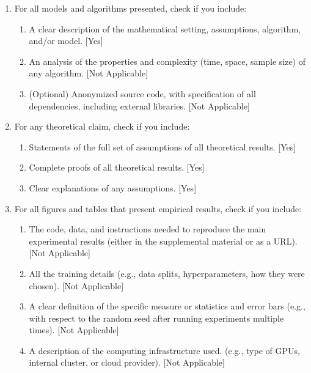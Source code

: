 \documentclass[twoside]{article}
\theoremstyle{definition}
\theoremstyle{remark}
\begin{document}
\begin{enumerate}

  \item For all models and algorithms presented, check if you include:
  \begin{enumerate}
    \item A clear description of the mathematical setting, assumptions, algorithm, and/or model. [Yes]
    \item An analysis of the properties and complexity (time, space, sample size) of any algorithm. [Not Applicable]
    \item (Optional) Anonymized source code, with specification of all dependencies, including external libraries. [Not Applicable]
  \end{enumerate}

  \item For any theoretical claim, check if you include:
  \begin{enumerate}
    \item Statements of the full set of assumptions of all theoretical results. [Yes]
    \item Complete proofs of all theoretical results. [Yes]
    \item Clear explanations of any assumptions. [Yes]     
  \end{enumerate}

  \item For all figures and tables that present empirical results, check if you include:
  \begin{enumerate}
    \item The code, data, and instructions needed to reproduce the main experimental results (either in the supplemental material or as a URL). [Not Applicable]
    \item All the training details (e.g., data splits, hyperparameters, how they were chosen). [Not Applicable]
    \item A clear definition of the specific measure or statistics and error bars (e.g., with respect to the random seed after running experiments multiple times). [Not Applicable]
    \item A description of the computing infrastructure used. (e.g., type of GPUs, internal cluster, or cloud provider). [Not Applicable]
  \end{enumerate}


\end{enumerate}
\end{document}

